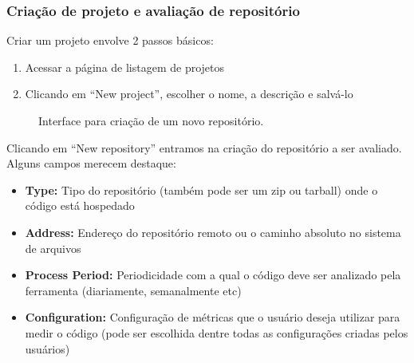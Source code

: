 \documentclass[12pt]{article}
\begin{document}
    \subsubsection{Criação de projeto e avaliação de repositório}

    Criar um projeto envolve 2 passos básicos:
    \begin{enumerate}
      \item Acessar a página de listagem de projetos
      \item Clicando em ``New project'', escolher o nome, a descrição e salvá-lo
    \end{enumerate}

    \begin{figure}[h!]
      \centering
      \caption{Interface para criação de um novo repositório.}
      \label{fig:choose-metric}
    \end{figure}

    Clicando em ``New repository'' entramos na criação do repositório a ser avaliado. Alguns campos merecem destaque:
    \begin{itemize}
      \item \textbf{Type:} Tipo do repositório (também pode ser um zip ou tarball) onde o código está hospedado
      \item \textbf{Address:} Endereço do repositório remoto ou o caminho absoluto no sistema de arquivos
      \item \textbf{Process Period:} Periodicidade com a qual o código deve ser analizado pela ferramenta (diariamente, semanalmente etc)
      \item \textbf{Configuration:} Configuração de métricas que o usuário deseja utilizar para medir o código (pode ser escolhida dentre todas as configurações criadas pelos usuários)
    \end{itemize}
\end{document}
